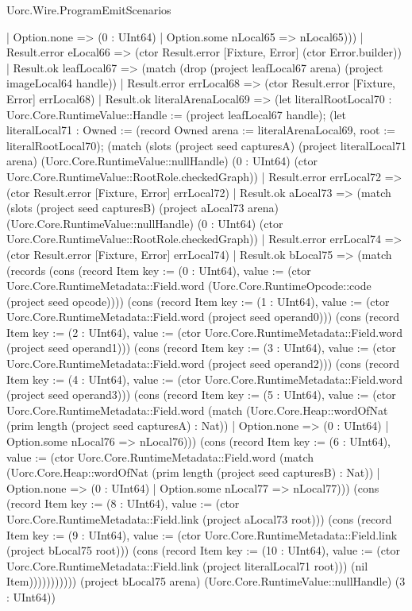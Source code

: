 \begin{lexlean}{Uorc.Wire.ProgramEmitScenarios}
\begin{semanticmodule}
{        | Option.none => (0 : UInt64)
        | Option.some nLocal65 => nLocal65)))
      | Result.error eLocal66 => (ctor Result.error [Fixture, Error] (ctor Error.builder))
      | Result.ok leafLocal67 => (match (drop (project leafLocal67 arena) (project imageLocal64 handle))
        | Result.error errLocal68 => (ctor Result.error [Fixture, Error] errLocal68)
        | Result.ok literalArenaLocal69 => (let literalRootLocal70 : Uorc.Core.RuntimeValue::Handle := (project leafLocal67 handle); (let literalLocal71 : Owned := (record Owned {arena := literalArenaLocal69, root := literalRootLocal70}); (match (slots (project seed capturesA) (project literalLocal71 arena) (Uorc.Core.RuntimeValue::nullHandle) (0 : UInt64) (ctor Uorc.Core.RuntimeValue::RootRole.checkedGraph))
          | Result.error errLocal72 => (ctor Result.error [Fixture, Error] errLocal72)
          | Result.ok aLocal73 => (match (slots (project seed capturesB) (project aLocal73 arena) (Uorc.Core.RuntimeValue::nullHandle) (0 : UInt64) (ctor Uorc.Core.RuntimeValue::RootRole.checkedGraph))
            | Result.error errLocal74 => (ctor Result.error [Fixture, Error] errLocal74)
            | Result.ok bLocal75 => (match (records (cons (record Item {key := (0 : UInt64), value := (ctor Uorc.Core.RuntimeMetadata::Field.word (Uorc.Core.RuntimeOpcode::code (project seed opcode)))}) (cons (record Item {key := (1 : UInt64), value := (ctor Uorc.Core.RuntimeMetadata::Field.word (project seed operand0))}) (cons (record Item {key := (2 : UInt64), value := (ctor Uorc.Core.RuntimeMetadata::Field.word (project seed operand1))}) (cons (record Item {key := (3 : UInt64), value := (ctor Uorc.Core.RuntimeMetadata::Field.word (project seed operand2))}) (cons (record Item {key := (4 : UInt64), value := (ctor Uorc.Core.RuntimeMetadata::Field.word (project seed operand3))}) (cons (record Item {key := (5 : UInt64), value := (ctor Uorc.Core.RuntimeMetadata::Field.word (match (Uorc.Core.Heap::wordOfNat (prim length (project seed capturesA) : Nat))
                | Option.none => (0 : UInt64)
                | Option.some nLocal76 => nLocal76))}) (cons (record Item {key := (6 : UInt64), value := (ctor Uorc.Core.RuntimeMetadata::Field.word (match (Uorc.Core.Heap::wordOfNat (prim length (project seed capturesB) : Nat))
                | Option.none => (0 : UInt64)
                | Option.some nLocal77 => nLocal77))}) (cons (record Item {key := (8 : UInt64), value := (ctor Uorc.Core.RuntimeMetadata::Field.link (project aLocal73 root))}) (cons (record Item {key := (9 : UInt64), value := (ctor Uorc.Core.RuntimeMetadata::Field.link (project bLocal75 root))}) (cons (record Item {key := (10 : UInt64), value := (ctor Uorc.Core.RuntimeMetadata::Field.link (project literalLocal71 root))}) (nil Item))))))))))) (project bLocal75 arena) (Uorc.Core.RuntimeValue::nullHandle) (3 : UInt64))
}
\end{semanticmodule}
\end{lexlean}
